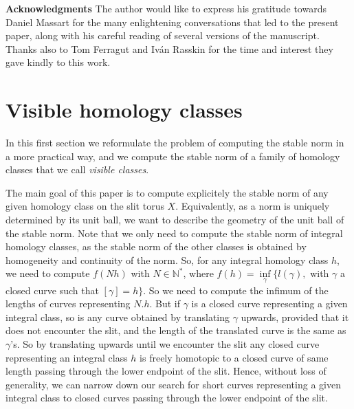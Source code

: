 \documentclass{article}
\newcommand{\NN}{\mathbb{N}}
\theoremstyle{definition}
\begin{document}
\textbf{Acknowledgments} The author would like to express his gratitude towards Daniel Massart for the many enlightening conversations that led to the present paper, along with his careful reading of several versions of the manuscript. Thanks also to Tom Ferragut and Iv\'an Rasskin for the time and interest they gave kindly to this work.
















\section{Visible homology classes}

In this first section we reformulate the problem of computing the stable norm in a more practical way, and we compute the stable norm of a family of homology classes that we call \emph{visible classes}. \newline \newline

The main goal of this paper is to compute explicitely the stable norm of any given homology class on the slit torus $X$. Equivalently, as a norm is uniquely determined by its unit ball, we want to describe the geometry of the unit ball of the stable norm. Note that we only need to compute the stable norm of integral homology classes, as the stable norm of the other classes is obtained by homogeneity and continuity of the norm. So, for any integral homology class $h$, we need to compute $f(Nh)$ with $N\in\NN^*$, where $f(h) = \inf\limits_{\gamma}  \{ l(\gamma), $ with $\gamma$ a closed curve such that $[\gamma]=h \}$. So we need to compute the infimum of the lengths of curves representing $N.h$.  But if $\gamma$ is a closed curve representing a given integral class, so is any curve obtained by translating $\gamma$ upwards, provided that it does not encounter the slit, and the length of the translated curve is the same as $\gamma$'s. So by translating upwards until we encounter the slit any closed curve representing an integral class $h$ is freely homotopic to a closed curve of same length passing through the lower endpoint of the slit. Hence, without loss of generality, we can narrow down our search for short curves representing a given integral class to closed curves passing through the lower endpoint of the slit. \newline 
\end{document}
